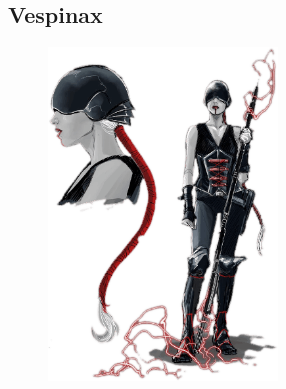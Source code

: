 \subsection{Vespinax} \label{sec:vespinax}
\begin{figure}[h!]
    \centering
    \includegraphics[height=250pt]{_img/pnjs/vespinax.png}
\end{figure}
